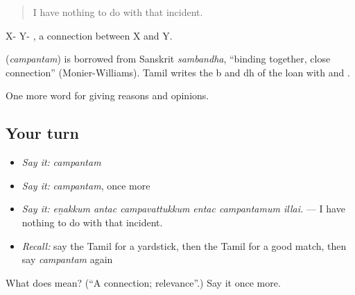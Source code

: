 \begin{quote}
I have nothing to do with that incident.
\end{quote}

X- Y- , a connection between X and Y.

\begin{cousinweb}
\textbf{} (\emph{campantam}) is borrowed from Sanskrit \emph{sambandha}, \textquotedblleft{}binding together, close connection\textquotedblright{} (Monier-Williams). Tamil writes the b and dh of the loan with  and .
\end{cousinweb}

\begin{grammarlens}[title={What you've built}]
One more word for giving reasons and opinions.
\end{grammarlens}

\subsection*{Your turn}
\begin{itemize}
\raggedright
  \item \emph{Say it:} \emph{campantam}
  \item \emph{Say it:} \emph{campantam}, once more
  \item \emph{Say it:} \emph{eṉakkum antac campavattukkum entac campantamum illai.} — I have nothing to do with that incident.
  \item \emph{Recall:} say the Tamil for a yardstick, then the Tamil for a good match, then say \emph{campantam} again
\end{itemize}

\begin{tcolorbox}[breakable,colback=teal!4,colframe=teal!35!black,title={Before you move on}]
What does  mean? (\textquotedblleft{}A connection; relevance\textquotedblright{}.) Say it once more.
\end{tcolorbox}
